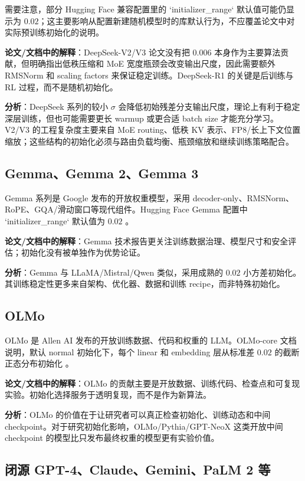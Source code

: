 \documentclass[UTF8,a4paper,11pt]{ctexart}
\begin{document}
需要注意，部分 Hugging Face 兼容配置里的 `initializer\_range` 默认值可能仍显示为 $0.02$；这主要影响从配置新建随机模型时的库默认行为，不应覆盖论文中对实际预训练初始化的说明。

\textbf{论文/文档中的解释}：DeepSeek-V2/V3 论文没有把 $0.006$ 本身作为主要算法贡献，但明确指出低秩压缩和 MoE 宽度瓶颈会改变输出尺度，因此需要额外 RMSNorm 和 scaling factors 来保证稳定训练。DeepSeek-R1 的关键是后训练与 RL 过程，而不是随机初始化。

\textbf{分析}：DeepSeek 系列的较小 $\sigma$ 会降低初始残差分支输出尺度，理论上有利于稳定深层训练，但也可能需要更长 warmup 或更合适 batch size 才能充分学习。V2/V3 的工程复杂度主要来自 MoE routing、低秩 KV 表示、FP8/长上下文位置缩放；这些结构的初始化必须与路由负载均衡、瓶颈缩放和继续训练策略配合。

\subsection{Gemma、Gemma 2、Gemma 3}

Gemma 系列是 Google 发布的开放权重模型，采用 decoder-only、RMSNorm、RoPE、GQA/滑动窗口等现代组件。Hugging Face Gemma 配置中 `initializer\_range` 默认值为 $0.02$ \cite{gemmadocs}。

\textbf{论文/文档中的解释}：Gemma 技术报告更关注训练数据治理、模型尺寸和安全评估；初始化没有被单独作为优势论证。

\textbf{分析}：Gemma 与 LLaMA/Mistral/Qwen 类似，采用成熟的 $0.02$ 小方差初始化。其训练稳定性更多来自架构、优化器、数据和训练 recipe，而非特殊初始化。

\subsection{OLMo}

OLMo 是 Allen AI 发布的开放训练数据、代码和权重的 LLM。OLMo-core 文档说明，默认 normal 初始化下，每个 linear 和 embedding 层从标准差 $0.02$ 的截断正态分布初始化 \cite{olmodocs,olmopaper}。

\textbf{论文/文档中的解释}：OLMo 的贡献主要是开放数据、训练代码、检查点和可复现实验。初始化选择服务于透明复现，而不是作为新算法。

\textbf{分析}：OLMo 的价值在于让研究者可以真正检查初始化、训练动态和中间 checkpoint。对于研究初始化影响，OLMo/Pythia/GPT-NeoX 这类开放中间 checkpoint 的模型比只发布最终权重的模型更有实验价值。


\subsection{闭源 GPT-4、Claude、Gemini、PaLM 2 等}
\end{document}
